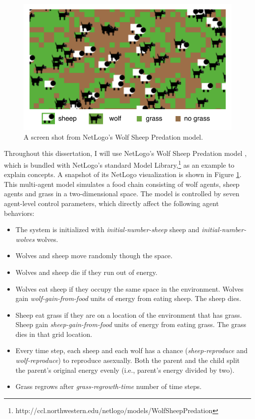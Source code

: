 \begin{figure}[ht]
\centering
\includegraphics{images/intro_wolfsheep.pdf}
\caption{A screen shot from NetLogo's Wolf Sheep Predation model.}
\label{fig:wolfsheep}
\end{figure}




Throughout this dissertation, I will use NetLogo's Wolf Sheep Predation model \cite{wolfsheep}, which is bundled with NetLogo's standard Model Library,\footnote{http://ccl.northwestern.edu/netlogo/models/WolfSheepPredation} as an example to explain concepts.
A snapshot of its NetLogo visualization is shown in Figure \ref{fig:wolfsheep}.
This multi-agent model simulates a food chain consisting of wolf agents, sheep agents and grass in a two-dimensional space.
The model is controlled by seven agent-level control parameters, which directly affect the following agent behaviors:
\begin{itemize}
  \item The system is initialized with \textit{initial-number-sheep} sheep and \textit{initial-number-wolves} wolves.
  \item Wolves and sheep move randomly though the space.
  \item Wolves and sheep die if they run out of energy.
  \item Wolves eat sheep if they occupy the same space in the environment. Wolves gain \textit{wolf-gain-from-food} units of energy from eating sheep. The sheep dies.
  \item Sheep eat grass if they are on a location of the environment that has grass. Sheep gain \textit{sheep-gain-from-food} units of energy from eating grass. The grass dies in that grid location.
  \item Every time step, each sheep and each wolf has a chance (\textit{sheep-reproduce} and \textit{wolf-reproduce}) to reproduce asexually. Both the parent and the child split the parent's original energy evenly (i.e., parent's energy divided by two).
  \item Grass regrows after \textit{grass-regrowth-time} number of time steps.
\end{itemize}

